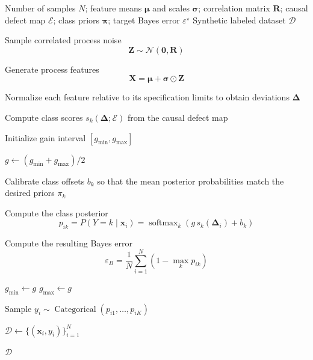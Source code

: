 \label{alg:generator}

\begin{algorithmic}[1]

\Require Number of samples $N$; feature means $\bm{\mu}$ and scales
$\bm{\sigma}$; correlation matrix $\mathbf{R}$; causal defect map
$\mathcal{E}$; class priors $\bm{\pi}$; target Bayes error
$\varepsilon^\star$
\Ensure Synthetic labeled dataset $\mathcal{D}$

\State Sample correlated process noise
\[
    \mathbf{Z} \sim \mathcal{N}(\mathbf{0},\mathbf{R})
\]

\State Generate process features
\[
    \mathbf{X}
    = \bm{\mu} + \bm{\sigma}\odot\mathbf{Z}
\]

\State Normalize each feature relative to its specification limits
to obtain deviations $\bm{\Delta}$

\State Compute class scores $s_k(\bm{\Delta};\mathcal{E})$
from the causal defect map

\State Initialize gain interval $[g_{\min},g_{\max}]$

\Repeat
    \State $g \gets (g_{\min}+g_{\max})/2$

    \State Calibrate class offsets $b_k$ so that the mean posterior
    probabilities match the desired priors $\pi_k$

    \State Compute the class posterior
    \[
        p_{ik}
        =
        P(Y=k\mid\mathbf{x}_i)
        =
        \operatorname{softmax}_k
        \left(g\,s_k(\bm{\Delta}_i)+b_k\right)
    \]

    \State Compute the resulting Bayes error
    \[
        \varepsilon_B
        =
        \frac{1}{N}
        \sum_{i=1}^{N}
        \left(1-\max_k p_{ik}\right)
    \]

        \State $g_{\min} \gets g$
    \Else
        \State $g_{\max} \gets g$
    \EndIf
{}

    \State Sample
    $y_i \sim \operatorname{Categorical}(p_{i1},\ldots,p_{iK})$
\EndFor

\State $\mathcal{D}\gets\{(\mathbf{x}_i,y_i)\}_{i=1}^{N}$

\State \Return $\mathcal{D}$

\end{algorithmic}


